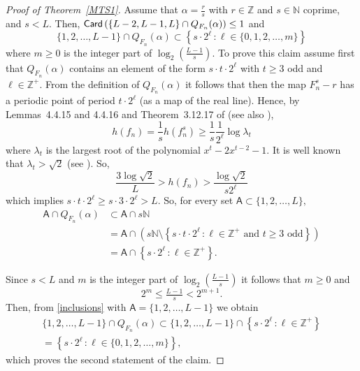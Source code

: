 \documentclass[a4paper, 11pt]{amsart}
\numberwithin{equation}{section}
\theoremstyle{customnumberedtheorem}
\theoremstyle{definitionwithbfnote}
\newenvironment{autocase}[2][Case]{\case{#1 #2.}}{\endcase}
\newcommand{\N}{\ensuremath{\mathbb{N}}}
\newcommand{\Z}{\ensuremath{\mathbb{Z}}}
\DeclareMathOperator{\Card}{\textsf{\upshape Card}}
\newcommand{\set}[2]{\ensuremath{\left\{#1 \,\colon #2\right\}}}
\begin{document}
\begin{proof}[Proof of Theorem~\ref{MTS1}]
\begin{autocase}[Claim]{3}
Assume that $\alpha = \tfrac{r}{s}$ with $r\in\Z$ and $s\in \N$ coprime, and $s < L.$
Then, $\Card\left(\{L-2, L-1, L\} \cap Q_{F_n}(\alpha)\right) \le 1$ and
\[
  \{1,2,\dots,L-1\} \cap Q_{F_n}(\alpha) \subset \set{s \cdot 2^\ell}{\ell\in\{0,1,2,\dots,m\}}
\]
where $m \ge 0$ is the integer part of $\log_2\left(\tfrac{L-1}{s}\right).$
\end{autocase}
To prove this claim assume first that $Q_{F_n}(\alpha)$ contains
an element of the form
$s \cdot t \cdot 2^\ell$ with $t \ge 3$ odd and $\ell \in \Z^+.$
From the definition of $Q_{F_n}(\alpha)$ it follows that then
the map $F_n^{s}-r$ has a periodic point of period $t \cdot 2^\ell$
(as a map of the real line).
Hence, by Lemmas~4.4.15 and 4.4.16 and Theorem~3.12.17 of \cite{alm}
(see also \cite[page~264]{alm}),
\[
  h(f_n) = \frac{1}{s} h(f_n^{s}) \ge \frac{1}{s} \frac{1}{2^\ell} \log \lambda_t
\]
where $\lambda_t$ is the largest root of the polynomial $x^t - 2x^{t-2} - 1.$
It is well known that $\lambda_t  > \sqrt{2}$ (see \cite[page~232]{alm}). So,
\[
 \frac{3\log \sqrt{2}}{L}> h(f_n) >\frac{\log \sqrt{2}}{s 2^\ell}
\]
which implies $s \cdot t \cdot 2^\ell \ge s\cdot 3\cdot2^\ell > L.$
So, for every set $\mathsf{A} \subset \{1,2,\dots,L\},$
\begin{equation}\label{inclusions}
\begin{split}
  \mathsf{A} \cap Q_{F_n}(\alpha)
     &\subset \mathsf{A} \cap s \N \\
     &= \mathsf{A} \cap \left(s \N\setminus \set{s \cdot t \cdot 2^\ell}{\ell\in\Z^+ \text{ and } t \ge 3 \text{ odd}}\right) \\
     &= \mathsf{A} \cap \set{s \cdot 2^\ell}{\ell\in\Z^+}.
\end{split}
\end{equation}

Since $s < L$ and $m$ is the integer part of
$\log_2\left(\tfrac{L-1}{s}\right)$ it follows that $m \ge 0$ and
\begin{equation}\label{counting}
  2^m \le \tfrac{L-1}{s} < 2^{m+1}.
\end{equation}
Then, from \eqref{inclusions} with $\mathsf{A} = \{1,2,\dots,L-1\}$ we obtain
\begin{multline*}
  \{1,2,\dots,L-1\} \cap Q_{F_n}(\alpha)
      \subset \{1,2,\dots,L-1\} \cap \set{ s \cdot 2^\ell}{\ell\in\Z^+} \\
      = \set{s \cdot 2^\ell}{\ell\in\{0,1,2,\dots,m\}},
\end{multline*}
which proves the second statement of the claim.


\end{proof}
\end{document}

